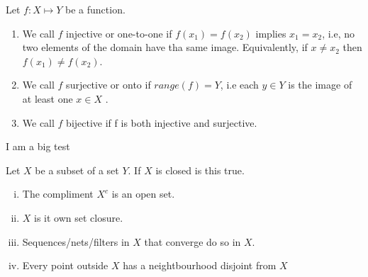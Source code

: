 \documentclass{article}
\theoremstyle{remark}
\begin{document}
\begin{definition}
  Let $f: X \mapsto Y$ be a function. 
  \begin{enumerate}
    \item We call $f$ injective or one-to-one if $f\left( x_1 \right)  = f\left( x_2 \right) $ implies $x_1=x_2$, i.e, no two elements of the domain have tha same image. Equivalently, if $x \neq x_2$ then $f\left( x_1 \right) \neq f\left( x_2 \right) $. 
    \item We call $f$ surjective or onto if $range\left( f \right) = Y$, i.e each $y \in Y$ is the image of at least one $x \in X$ .
    \item We call $f$ bijective if f is both injective and surjective.
  \end{enumerate}
\end{definition}

\begin{definition}[Testing]
  I am a big test 
  
\end{definition}

\begin{definition}

  Let $X$ be a subset of a set $Y$.
  If $X$ is closed is this true.
  \begin{enumerate}[(i)]
    \item The compliment $X^{c}$ is an open set.
    \item $X$ is it own set closure.
    \item Sequences/nets/filters in $X$ that converge do so in $X$.
    \item Every point outside  $X$ has a neightbourhood disjoint from $X$
  \end{enumerate}

\end{definition}



\end{document}
